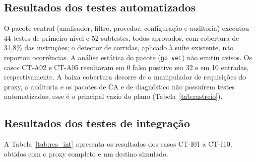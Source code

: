 \subsection{Resultados dos testes automatizados}

O pacote central (analisador, filtro, provedor, configuração e auditoria) executou 44 testes de primeiro nível e 52 subtestes, todos aprovados, com cobertura de 31,8\% das instruções; o detector de corridas, aplicado à suíte existente, não reportou ocorrências. A análise estática do pacote (\texttt{go vet}) não emitiu avisos. Os casos CT-A02 e CT-A05 resultaram em 0 falso positivo em 32 e em 10 entradas, respectivamente. A baixa cobertura decorre de o manipulador de requisições do proxy, a auditoria e os pacotes de CA e de diagnóstico não possuírem testes automatizados; esse é o principal vazio do plano (Tabela~\ref{tab:rastreio}).

\subsection{Resultados dos testes de integração}

A Tabela~\ref{tab:res_int} apresenta os resultados dos casos CT-I01 a CT-I10, obtidos com o proxy completo e um destino simulado.

